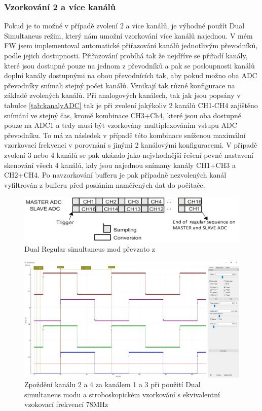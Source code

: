 \subsubsection{Vzorkování 2 a více kanálů}
Pokud je to možné  v případě zvolení 2 a více kanálů, je výhodné použít Dual Simultaneus režim, který nám umožní vzorkování více kanálů najednou. V mém FW jsem implementoval automatické přiřazování kanálů jednotlivým převodníků, podle jejich dostupnosti. Přiřazování probíhá tak že nejdříve se přiřadí kanály, které jsou dostupné pouze na jednom z převodníků a pak se posloupnosti kanálů doplní kanály dostupnými na obou převodnících tak, aby pokud možno oba ADC převodníky snímali stejný počet kanálů. Vznikají tak různé konfigurace na základě zvolených kanálů. Při analogových kanálech, tak jak jsou popsány v tabulce \ref{tab:kanalyADC} tak je při zvolení jakýkoliv 2 kanálů CH1-CH4 zajištěno snímání ve stejný čas, kromě kombinace CH3+Ch4, které jsou oba dostupné pouze na ADC1 a tedy musí být vzorkovány multiplexováním vstupu ADC převodníku. To má za následek v případě této kombinace sníženou maximální vzorkovací frekvenci v porovnání s jinými 2 kanálovými konfiguracemi. V případě zvolení 3 nebo 4 kanálů se pak ukázalo jako nejvhodnější řešení pevné nastavení skenování všech 4 kanálů, kdy jsou najednou snímany kanály CH1+CH3 a CH2+CH4. Po navzorkování bufferu je pak případně nezvolených kanál vyfiltrován z bufferu před posláním naměřených dat do počítače.
\begin{figure}[H]
	\centering
	\includegraphics[width=0.7\linewidth]{Figs/Screenshots/DualSimul2ADC}
	\caption{Dual Regular simultaneus mod převzato z \cite{refG4}}
	\label{fig:dualsimul2adc}
\end{figure}


\begin{figure}[H]
	\centering
	\includegraphics[width=0.7\linewidth]{Figs/Screenshots/DualSimul4Chn}
	\caption{Zpoždění kanálu 2 a 4 za kanálem 1 a 3 při použití Dual simultaneus modu a stroboskopickém vzorkování s ekvivalentní vzokovací frekvencí 78MHz}
	\label{fig:dualsimul4chn}
\end{figure}


